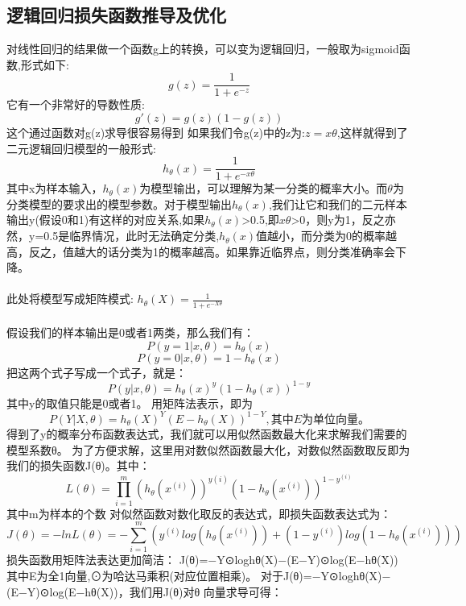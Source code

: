 \documentclass[18pt,a4paper,oneside,UTF8]{ctexart}
\begin{document}
\subsection{逻辑回归损失函数推导及优化}
对线性回归的结果做一个函数g上的转换，可以变为逻辑回归，一般取为sigmoid函数,形式如下:
\[
    g(z)=\frac {1}{1+e^{-z}}
\]
它有一个非常好的导数性质:
\[
    g'(z)=g(z)(1-g(z))    
\]
这个通过函数对g(z)求导很容易得到
如果我们令g(z)中的z为:$ z=x\theta$,这样就得到了二元逻辑回归模型的一般形式:
\[
    h_{\theta}(x)=\frac {1}{1+e^{-x\theta}}
\]
其中x为样本输入，$h_\theta(x)$为模型输出，可以理解为某一分类的概率大小。而$\theta$为分类模型的要求出的模型参数。对于模型输出$ h_\theta(x) $,我们让它和我们的二元样本输出y(假设0和1)有这样的对应关系,如果$h_\theta(x)$>0.5,即$x\theta$>0，则y为1，反之亦然，y=0.5是临界情况，此时无法确定分类,$h_\theta(x)$值越小，而分类为0的概率越高，反之，值越大的话分类为1的概率越高。如果靠近临界点，则分类准确率会下降。
\paragraph{}
此处将模型写成矩阵模式:
$h_\theta(X)=\frac {1}{1+e^{-X\theta}}$
\paragraph{}
假设我们的样本输出是0或者1两类，那么我们有：
\[
    P(y=1|x,\theta)=h_\theta(x)    
\]
\[
    P(y=0|x,\theta)=1-h_\theta(x)    
\]
把这两个式子写成一个式子，就是：
\[
    P(y|x,\theta)=h_\theta(x)^y(1-h_\theta(x))^{1-y}    
\]
其中y的取值只能是0或者1。
用矩阵法表示，即为
\[
    P(Y|X,\theta)=h_\theta(X)^Y(E-h_\theta(X))^{1-Y},其中E为单位向量。    
\]
得到了y的概率分布函数表达式，我们就可以用似然函数最大化来求解我们需要的模型系数θ。
为了方便求解，这里用对数似然函数最大化，对数似然函数取反即为我们的损失函数J(θ)。其中：
\[
    L(\theta)=\prod_{i=1}^m(h_\theta(x^{(i)}))^{y(i)}(1-h_\theta(x^{(i)}))^{1-y^{(i)}}  
\]
其中m为样本的个数
对似然函数对数化取反的表达式，即损失函数表达式为：
\[
    J(\theta)=-lnL(\theta)=-\sum_{i=1}^m(y^{(i)}log(h_\theta(x^{(i)}))+(1-y^{(i)})log(1-h_\theta(x^{(i)})))    
\]
损失函数用矩阵法表达更加简洁：\newline
J(θ)=−Y⊙loghθ(X)−(E−Y)⊙log(E−hθ(X))\newline
其中E为全1向量,⊙为哈达马乘积(对应位置相乘)。\newline
对于J(θ)=−Y⊙loghθ(X)−(E−Y)⊙log(E−hθ(X))，我们用J(θ)对θ\newline
向量求导可得：\newline
\end{document}
